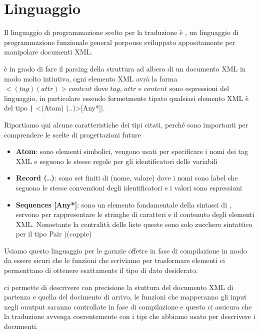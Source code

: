 \section{Linguaggio}
	Il linguaggio di programmazione scelto per la traduzione è \cduce, un linguaggio di programmazione funzionale general porpouse sviluppato appositamente per manipolare documenti XML.
	
	\cduce è in grado di fare il parsing della struttura ad albero di un documento XML in modo molto intiutivo, ogni elemento XML avrà la forma $<(tag) (attr)>content$ dove $tag$, $attr$ e $content$ sono espressioni del linguaggio, in particolare essendo \cduce formetmente tipato qualsiasi elemento XML è del tipo \texttt| <(Atom) ({..})>[Any*]|.
	
	Riportiamo qui alcune caratteristiche dei tipi citati, perché sono importanti per comprendere le scelte di progettazioni future
	\begin{itemize}
		\item \textbf{Atom}: sono elementi simbolici, vengono usati per specificare i nomi dei tag XML e seguono le stesse regole per gli identificatori delle variabili
		\item \textbf{Record ({..})}: sono set finiti di (nome, valore) dove i nomi sono label che seguono le stesse convenzioni degli identificatori e i valori sono espressioni
		\item \textbf{Sequences [Any*]}: sono un elemento fondamentale della sintassi di \cduce, servono per rappresentare le stringhe di caratteri e il contenuto degli elementi XML. Nonostante la centralità delle liste queste sono solo zucchero sintattico per il tipo Pair )(coppie)
	\end{itemize}
	Usiamo questo linguaggio per le garnzie offetre in fase di compilazione in modo da essere sicuri che le funzioni che scriviamo per trasformare elementi ci permenttano di ottenere esattamente il tipo di dato desiderato.
	
	\cduce ci permette di descrivere con precisione la stuttura del documento XML di partenza e quella del docimento di arrivo, le funzioni che mapperanno gli input negli ouutput saranno controllate in fase di compilazione e questo ci assicura che la traduzione avvenga coerentemente con i tipi che abbiamo usato per descrivere i documenti.